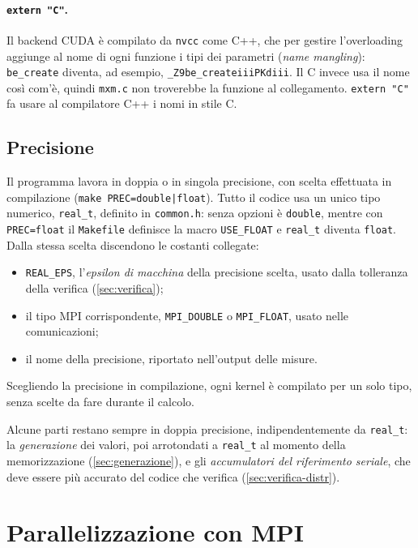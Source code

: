 \documentclass[11pt,a4paper]{article}
\begin{document}
\paragraph{\texttt{extern "C"}.} Il backend CUDA è compilato da \texttt{nvcc}
come C++, che per gestire l'overloading aggiunge al nome di ogni funzione i
tipi dei parametri (\emph{name mangling}): \texttt{be\_create} diventa, ad
esempio, \texttt{\_Z9be\_createiiiPKdiii}. Il C invece usa il nome così
com'è, quindi \texttt{mxm.c} non troverebbe la funzione al collegamento.
\texttt{extern "C"} fa usare al compilatore C++ i nomi in stile C.

\subsection{Precisione}\label{sec:precisione}

Il programma lavora in doppia o in singola precisione, con scelta effettuata in
compilazione (\texttt{make PREC=double|float}). Tutto il codice usa un unico
tipo numerico, \texttt{real\_t}, definito in \texttt{common.h}: senza opzioni
è \texttt{double}, mentre con \texttt{PREC=float} il \texttt{Makefile} definisce la
macro \texttt{USE\_FLOAT} e \texttt{real\_t} diventa \texttt{float}. Dalla
stessa scelta discendono le costanti collegate:
\begin{itemize}
  \item \texttt{REAL\_EPS}, l'\emph{epsilon di macchina} della precisione
        scelta, usato dalla tolleranza della verifica (\cref{sec:verifica});
  \item il tipo MPI corrispondente, \texttt{MPI\_DOUBLE} o
        \texttt{MPI\_FLOAT}, usato nelle comunicazioni;
  \item il nome della precisione, riportato nell'output delle misure.
\end{itemize}
Scegliendo la precisione in compilazione, ogni kernel è compilato per un solo
tipo, senza scelte da fare durante il calcolo.

Alcune parti restano sempre in doppia precisione, indipendentemente da
\texttt{real\_t}: la \emph{generazione} dei valori, poi arrotondati a
\texttt{real\_t} al momento della memorizzazione (\cref{sec:generazione}), e
gli \emph{accumulatori del riferimento seriale}, che deve essere più accurato
del codice che verifica (\cref{sec:verifica-distr}).

\section{Parallelizzazione con MPI}\label{sec:mpi}
\end{document}
